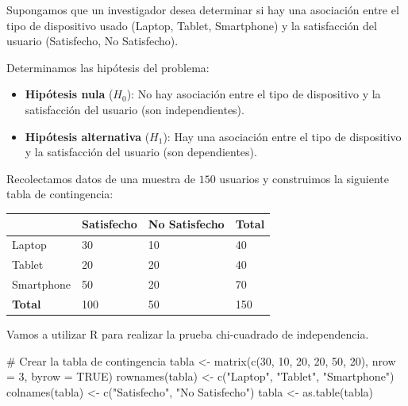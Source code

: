 \documentclass[
  letterpaper,
  DIV=11,
  numbers=noendperiod]{scrreprt}
\newenvironment{Shaded}{\begin{snugshade}}{\end{snugshade}}
\newcommand{\AttributeTok}[1]{\textcolor[rgb]{0.40,0.45,0.13}{#1}}
\newcommand{\CommentTok}[1]{\textcolor[rgb]{0.37,0.37,0.37}{#1}}
\newcommand{\ConstantTok}[1]{\textcolor[rgb]{0.56,0.35,0.01}{#1}}
\newcommand{\DecValTok}[1]{\textcolor[rgb]{0.68,0.00,0.00}{#1}}
\newcommand{\FunctionTok}[1]{\textcolor[rgb]{0.28,0.35,0.67}{#1}}
\newcommand{\NormalTok}[1]{\textcolor[rgb]{0.00,0.23,0.31}{#1}}
\newcommand{\OtherTok}[1]{\textcolor[rgb]{0.00,0.23,0.31}{#1}}
\newcommand{\StringTok}[1]{\textcolor[rgb]{0.13,0.47,0.30}{#1}}
\providecommand{\tightlist}{%
  \setlength{\itemsep}{0pt}\setlength{\parskip}{0pt}}\usepackage{longtable,booktabs,array}
\begin{document}
\begin{tcolorbox}[enhanced jigsaw, arc=.35mm, breakable, coltitle=black, left=2mm, opacityback=0, bottomtitle=1mm, colbacktitle=quarto-callout-tip-color!10!white, title=\textcolor{quarto-callout-tip-color}{\faLightbulb}\hspace{0.5em}{Ejemplo Práctico. Prueba Chi-cuadrado de independencia}, titlerule=0mm, colback=white, colframe=quarto-callout-tip-color-frame, bottomrule=.15mm, rightrule=.15mm, opacitybacktitle=0.6, toptitle=1mm, toprule=.15mm, leftrule=.75mm]

Supongamos que un investigador desea determinar si hay una asociación
entre el tipo de dispositivo usado (Laptop, Tablet, Smartphone) y la
satisfacción del usuario (Satisfecho, No Satisfecho).

Determinamos las hipótesis del problema:

\begin{itemize}
\tightlist
\item
  \textbf{Hipótesis nula} (\(H_0\)): No hay asociación entre el tipo de
  dispositivo y la satisfacción del usuario (son independientes).
\item
  \textbf{Hipótesis alternativa} (\(H_1\)): Hay una asociación entre el
  tipo de dispositivo y la satisfacción del usuario (son dependientes).
\end{itemize}

Recolectamos datos de una muestra de \(150\) usuarios y construimos la
siguiente tabla de contingencia:

\begin{longtable}[]{@{}llll@{}}
\toprule\noalign{}
& Satisfecho & No Satisfecho & Total \\
\midrule\noalign{}
\endhead
\bottomrule\noalign{}
\endlastfoot
Laptop & 30 & 10 & 40 \\
Tablet & 20 & 20 & 40 \\
Smartphone & 50 & 20 & 70 \\
\textbf{Total} & 100 & 50 & 150 \\
\end{longtable}

Vamos a utilizar R para realizar la prueba chi-cuadrado de
independencia.

\begin{Shaded}
\begin{Highlighting}[]
\CommentTok{\# Crear la tabla de contingencia}
\NormalTok{tabla }\OtherTok{\textless{}{-}} \FunctionTok{matrix}\NormalTok{(}\FunctionTok{c}\NormalTok{(}\DecValTok{30}\NormalTok{, }\DecValTok{10}\NormalTok{, }\DecValTok{20}\NormalTok{, }\DecValTok{20}\NormalTok{, }\DecValTok{50}\NormalTok{, }\DecValTok{20}\NormalTok{), }\AttributeTok{nrow =} \DecValTok{3}\NormalTok{, }\AttributeTok{byrow =} \ConstantTok{TRUE}\NormalTok{)}
\FunctionTok{rownames}\NormalTok{(tabla) }\OtherTok{\textless{}{-}} \FunctionTok{c}\NormalTok{(}\StringTok{"Laptop"}\NormalTok{, }\StringTok{"Tablet"}\NormalTok{, }\StringTok{"Smartphone"}\NormalTok{)}
\FunctionTok{colnames}\NormalTok{(tabla) }\OtherTok{\textless{}{-}} \FunctionTok{c}\NormalTok{(}\StringTok{"Satisfecho"}\NormalTok{, }\StringTok{"No Satisfecho"}\NormalTok{)}
\NormalTok{tabla }\OtherTok{\textless{}{-}} \FunctionTok{as.table}\NormalTok{(tabla)}


\end{Highlighting}
\end{Shaded}
\end{tcolorbox}
\end{document}

